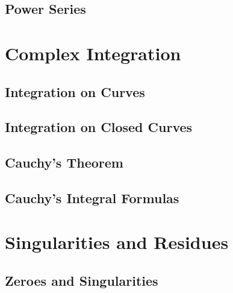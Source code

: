 \documentclass[oneside]{memoir}
\begin{document}
	


\section{Power Series}
\label{sec:power_series}




\chapter{Complex Integration}
\label{cha:complex_integration}

\section{Integration on Curves}
\label{sec:integration_on_curves}



\section{Integration on Closed Curves}
\label{sec:integration_on_closed_curves}





\section{Cauchy's Theorem}
\label{sec:cauchy_s_theorem}





\section{Cauchy's Integral Formulas}
\label{sec:cauchy_s_integral_formulas}





\chapter{Singularities and Residues}
\label{cha:singularities_and_residues}



\section{Zeroes and Singularities}
\label{sec:zeroes_and_singularities}
\end{document}
